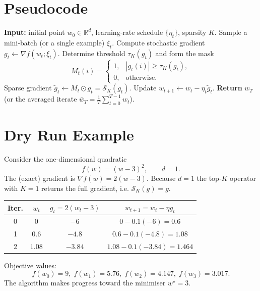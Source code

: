 \documentclass{article}
\newcommand{\R}{\mathbb{R}}
\newcommand{\topk}[1]{\mathcal{S}_K(#1)}
\begin{document}
\section*{Pseudocode}
\begin{algorithm}[H]
\caption{Top‑\(K\) SGD}
\label{alg:topk}
\begin{algorithmic}[1]
\STATE \textbf{Input:} initial point \(w_0\in\R^{d}\), learning‑rate schedule \(\{\eta_t\}\), sparsity \(K\).
    \STATE Sample a mini‑batch (or a single example) \(\xi_t\).
    \STATE Compute stochastic gradient \(g_t\gets\nabla f(w_t;\xi_t)\).
    \STATE Determine threshold \(\tau_K(g_t)\) and form the mask
    \[
        M_t(i)=\begin{cases}
               1,& |g_t(i)|\ge \tau_K(g_t),\\
               0,& \text{otherwise}.
              \end{cases}
    \]
    \STATE Sparse gradient \(\tilde g_t \gets M_t\odot g_t = \topk{g_t}\).
    \STATE Update \(w_{t+1}\gets w_t-\eta_t\tilde g_t\).
\ENDFOR
\STATE \textbf{Return} \(w_T\) (or the averaged iterate \(\bar w_T=\frac1T\sum_{t=0}^{T-1}w_t\)).
\end{algorithmic}
\end{algorithm}

\section*{Dry Run Example}
Consider the one‑dimensional quadratic
\[
f(w)=(w-3)^2,\qquad d=1.
\]
The (exact) gradient is \(\nabla f(w)=2(w-3)\).  
Because \(d=1\) the top‑\(K\) operator with \(K=1\) returns the full gradient, i.e. \(\topk{g}=g\).

\begin{center}
\begin{tabular}{c|c|c|c}
\textbf{Iter.} & $w_t$ & $g_t=2(w_t-3)$ & $w_{t+1}=w_t-\eta g_t$ \\ \hline
0 & $0$ & $-6$ & $0-0.1(-6)=0.6$\\
1 & $0.6$ & $-4.8$ & $0.6-0.1(-4.8)=1.08$\\
2 & $1.08$ & $-3.84$ & $1.08-0.1(-3.84)=1.464$\\
\end{tabular}
\end{center}
Objective values:
\[
f(w_0)=9,\; f(w_1)=5.76,\; f(w_2)=4.147,\; f(w_3)=3.017.
\]
The algorithm makes progress toward the minimiser \(w^\star=3\).

\newpage
\end{document}
